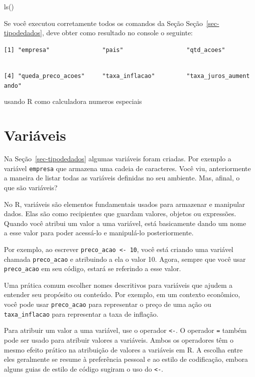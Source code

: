 \documentclass[
  portuguese,
  letterpaper,
  DIV=11,
  numbers=noendperiod]{scrreprt}
\newenvironment{Shaded}{\begin{snugshade}}{\end{snugshade}}
\newcommand{\FunctionTok}[1]{\textcolor[rgb]{0.28,0.35,0.67}{#1}}
\newcommand{\NormalTok}[1]{\textcolor[rgb]{0.00,0.23,0.31}{#1}}
\theoremstyle{definition}
\theoremstyle{remark}
\begin{document}
\begin{Shaded}
\begin{Highlighting}[]
\FunctionTok{ls}\NormalTok{()}
\end{Highlighting}
\end{Shaded}

Se você executou corretamente todos os comandos da Seção
Seção~\ref{sec-tipodedados}, deve obter como resultado no console o
seguinte:

\texttt{{[}1{]}\ "empresa"\ \ \ \ \ \ \ \ \ \ \ \ \ \ \ "pais"\ \ \ \ \ \ \ \ \ \ \ \ \ \ \ \ \ \ "qtd\_acoes"}\strut \\
\texttt{{[}4{]}\ "queda\_preco\_acoes"\ \ \ \ \ "taxa\_inflacao"\ \ \ \ \ \ \ \ \ "taxa\_juros\_aumentando"}

usando R como calculadora numeros especiais

\section{Variáveis}\label{variuxe1veis}

Na Seção~\ref{sec-tipodedados} algumas variáveis foram criadas. Por
exemplo a variável \texttt{empresa} que armazena uma cadeia de
caracteres. Você viu, anteriormente a maneira de listar todas as
variáveis definidas no seu ambiente. Mas, afinal, o que são variáveis?

No R, variáveis são elementos fundamentais usados para armazenar e
manipular dados. Elas são como recipientes que guardam valores, objetos
ou expressões. Quando você atribui um valor a uma variável, está
basicamente dando um nome a esse valor para poder acessá-lo e
manipulá-lo posteriormente.

Por exemplo, ao escrever \texttt{preco\_acao\ \textless{}-\ 10}, você
está criando uma variável chamada \texttt{preco\_acao} e atribuindo a
ela o valor 10. Agora, sempre que você usar \texttt{preco\_acao} em seu
código, estará se referindo a esse valor.

Uma prática comum escolher nomes descritivos para variáveis que ajudem a
entender seu propósito ou conteúdo. Por exemplo, em um contexto
econômico, você pode usar \texttt{preco\_acao} para representar o preço
de uma ação ou \texttt{taxa\_inflacao} para representar a taxa de
inflação.

Para atribuir um valor a uma variável, use o operador
\texttt{\textless{}-}. O operador \texttt{=} também pode ser usado para
atribuir valores a variáveis. Ambos os operadores têm o mesmo efeito
prático na atribuição de valores a variáveis em R. A escolha entre eles
geralmente se resume à preferência pessoal e ao estilo de codificação,
embora alguns guias de estilo de código sugiram o uso do
\texttt{\textless{}-}.
\end{document}
